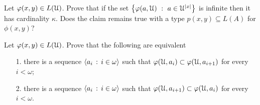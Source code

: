 \documentclass[creche.tex]{subfiles}
\begin{document}
\begin{exercise}\label{cadinalitafinitasaturazioneinsiemi}
Let $\varphi(x,y)\in L(\EuScript U)$. Prove that if the set $\big\{\phi(a,\U)\ :\ a\in\U^{|x|}\big\}$ is infinite then it has cardinality $\kappa$. Does the claim remains true with a type $p(x,y)\subseteq L(A)$ for $\phi(x,y)$?\QED 
\end{exercise}

\begin{exercise} 
Let $\varphi(x,y)\in L(\EuScript U)$. Prove that the following are equivalent
\begin{itemize}
\item[1.] there is a sequence $\langle a_i\,:\,i\in\omega\rangle$ such that $\varphi(\EuScript U,a_i)\subset\varphi(\EuScript U,a_{i+1})$ for every $i<\omega$;
\item[2.] there is a sequence $\langle a_i\,:\,i\in\omega\rangle$ such that $\varphi(\EuScript U,a_{i+1})\subset\varphi(\EuScript U,a_i)$ for every $i<\omega$.\QED  
\end{itemize}
\end{exercise}
\end{document}
